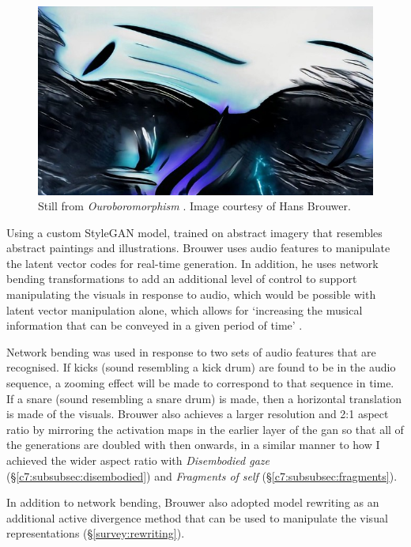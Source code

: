 \begin{figure}[!htb]
    \centering
    \captionsetup{justification=centering}
    \includegraphics[width=1\textwidth]{figures/c7_impact/other-artworks/Ouroboromorphism.png}
    \caption[Still from \textit{Ouroboromorphism}]{Still from \textit{Ouroboromorphism} \citep{brouwer2020ourobo}. Image courtesy of Hans Brouwer.}
    \label{fig:c7:ouroboromorphism}
\end{figure}


Using a custom StyleGAN model, trained on abstract imagery that resembles abstract paintings and illustrations.
 Brouwer uses audio features to manipulate the latent vector codes for real-time generation. 
 In addition, he uses network bending transformations to add an additional level of control to support manipulating the visuals in response to audio, which would be possible with latent vector manipulation alone, which allows for `increasing the musical information that can be conveyed in a given period of time' \citep{brouwer2020audio}. 

Network bending was used in response to two sets of audio features that are recognised.
If kicks (sound resembling a kick drum) are found to be in the audio sequence, a zooming effect will be made to correspond to that sequence in time. If a snare (sound resembling a snare drum) is made, then a horizontal translation is made of the visuals. 
Brouwer also achieves a larger resolution and 2:1 aspect ratio by mirroring the activation maps in the earlier layer of the gan so that all of the generations are doubled with then onwards, in a similar manner to how I achieved the wider aspect ratio with \textit{Disembodied gaze} (\S \ref{c7:subsubsec:disembodied}) and \textit{Fragments of self} (\S \ref{c7:subsubsec:fragments}). 

In addition to network bending, Brouwer also adopted model rewriting \citep{bau2020rewriting} as an additional active divergence method that can be used to manipulate the visual representations (\S \ref{survey:rewriting}).

